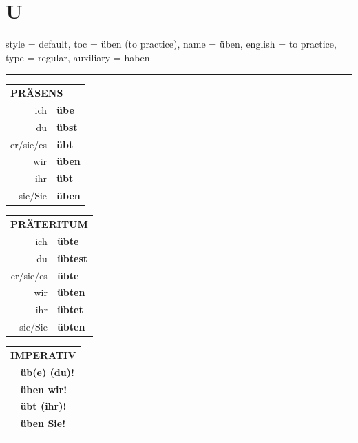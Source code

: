 \section{U}

\begin{verbentry}{
  style = {default},
  toc = {üben (to practice)},
  name = {üben},
  english = {to practice},
  type = {regular},
  auxiliary = {haben}
}
 
    
     \vspace{5pt}

    \hrule
    
    \vspace{5pt}

  \begin{tabular}{rl}
     \multicolumn{2}{l}{\textbf{PRÄSENS} }\\
    ich & \textbf{übe}\\
    du & \textbf{übst}\\
    er/sie/es & \textbf{übt}\\
    wir & \textbf{üben}\\
    ihr & \textbf{übt}\\
    sie/Sie & \textbf{üben}\\
  \end{tabular}
  \hfill
     \begin{tabular}{rl}
    \multicolumn{2}{l}{\textbf{PRÄTERITUM} }\\
    ich & \textbf{übte}\\
    du & \textbf{übtest}\\
    er/sie/es & \textbf{übte}\\
    wir & \textbf{übten}\\
    ihr & \textbf{übtet}\\
    sie/Sie & \textbf{übten}\\
  \end{tabular}
  \hfill
  \begin{tabular}{rl}
     \multicolumn{2}{l}{\textbf{IMPERATIV} }\\
   & \textbf{üb(e) (du)!}\\
   & \textbf{üben wir!}\\
   & \textbf{übt (ihr)!}\\
   & \textbf{üben Sie!}\\
   & \vspace{10pt}
  \end{tabular}

    \vspace{10pt}


\end{verbentry}
